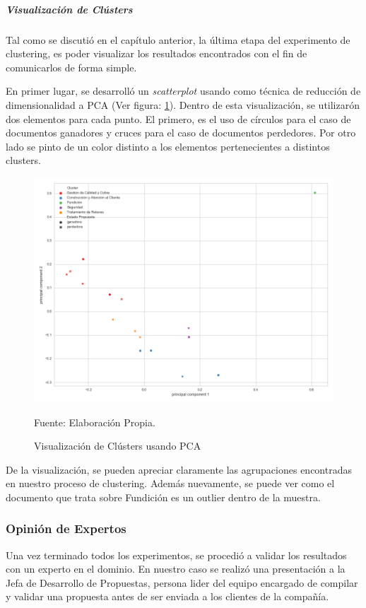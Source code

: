 \subparagraph{Visualización de Clústers}
    Tal como se discutió en el capítulo anterior, la última etapa del experimento de clustering, es poder visualizar los resultados encontrados con el fin de comunicarlos de forma simple. 
    
    En primer lugar, se desarrolló un \textit{scatterplot} usando como técnica de reducción de dimensionalidad a PCA (Ver figura: \ref{fig:PCA}). Dentro de esta visualización, se utilizarón dos elementos para cada punto. El primero, es el uso de círculos para el caso de documentos ganadores y cruces para el caso de documentos perdedores. Por otro lado se pinto de un color distinto a los elementos pertenecientes a distintos clusters.
    
    \begin{figure}[H]
        \centering
        \includegraphics[width=1\textwidth]{figures/Clustering/PCA.png}
        \caption{\label{fig:PCA} Visualización de Clústers usando PCA} Fuente: Elaboración Propia.
    \end{figure}
    
    De la visualización, se pueden apreciar claramente las agrupaciones encontradas en nuestro proceso de clustering. Además nuevamente, se puede ver como el documento que trata sobre Fundición es un outlier dentro de la muestra. 
    
\subsubsection{Opinión de Expertos}
    Una vez terminado todos los experimentos, se procedió a validar los resultados con un experto en el dominio. En nuestro caso se realizó una presentación a la Jefa de Desarrollo de Propuestas, persona lider del equipo encargado de compilar y validar una propuesta antes de ser enviada a los clientes de la compañía.
    
